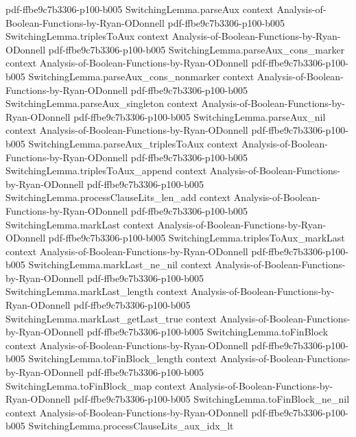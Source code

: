 \begin{lemma}
  {pdf-ffbe9c7b3306-p100-b005}
\proofstep
  {SwitchingLemma.parseAux}
  {context}
  {Analysis-of-Boolean-Functions-by-Ryan-ODonnell}
  {pdf-ffbe9c7b3306-p100-b005}
\proofstep
  {SwitchingLemma.triplesToAux}
  {context}
  {Analysis-of-Boolean-Functions-by-Ryan-ODonnell}
  {pdf-ffbe9c7b3306-p100-b005}
\proofstep
  {SwitchingLemma.parseAux_cons_marker}
  {context}
  {Analysis-of-Boolean-Functions-by-Ryan-ODonnell}
  {pdf-ffbe9c7b3306-p100-b005}
\proofstep
  {SwitchingLemma.parseAux_cons_nonmarker}
  {context}
  {Analysis-of-Boolean-Functions-by-Ryan-ODonnell}
  {pdf-ffbe9c7b3306-p100-b005}
\proofstep
  {SwitchingLemma.parseAux_singleton}
  {context}
  {Analysis-of-Boolean-Functions-by-Ryan-ODonnell}
  {pdf-ffbe9c7b3306-p100-b005}
\proofstep
  {SwitchingLemma.parseAux_nil}
  {context}
  {Analysis-of-Boolean-Functions-by-Ryan-ODonnell}
  {pdf-ffbe9c7b3306-p100-b005}
\proofstep
  {SwitchingLemma.parseAux_triplesToAux}
  {context}
  {Analysis-of-Boolean-Functions-by-Ryan-ODonnell}
  {pdf-ffbe9c7b3306-p100-b005}
\proofstep
  {SwitchingLemma.triplesToAux_append}
  {context}
  {Analysis-of-Boolean-Functions-by-Ryan-ODonnell}
  {pdf-ffbe9c7b3306-p100-b005}
\proofstep
  {SwitchingLemma.processClauseLits_len_add}
  {context}
  {Analysis-of-Boolean-Functions-by-Ryan-ODonnell}
  {pdf-ffbe9c7b3306-p100-b005}
\proofstep
  {SwitchingLemma.markLast}
  {context}
  {Analysis-of-Boolean-Functions-by-Ryan-ODonnell}
  {pdf-ffbe9c7b3306-p100-b005}
\proofstep
  {SwitchingLemma.triplesToAux_markLast}
  {context}
  {Analysis-of-Boolean-Functions-by-Ryan-ODonnell}
  {pdf-ffbe9c7b3306-p100-b005}
\proofstep
  {SwitchingLemma.markLast_ne_nil}
  {context}
  {Analysis-of-Boolean-Functions-by-Ryan-ODonnell}
  {pdf-ffbe9c7b3306-p100-b005}
\proofstep
  {SwitchingLemma.markLast_length}
  {context}
  {Analysis-of-Boolean-Functions-by-Ryan-ODonnell}
  {pdf-ffbe9c7b3306-p100-b005}
\proofstep
  {SwitchingLemma.markLast_getLast_true}
  {context}
  {Analysis-of-Boolean-Functions-by-Ryan-ODonnell}
  {pdf-ffbe9c7b3306-p100-b005}
\proofstep
  {SwitchingLemma.toFinBlock}
  {context}
  {Analysis-of-Boolean-Functions-by-Ryan-ODonnell}
  {pdf-ffbe9c7b3306-p100-b005}
\proofstep
  {SwitchingLemma.toFinBlock_length}
  {context}
  {Analysis-of-Boolean-Functions-by-Ryan-ODonnell}
  {pdf-ffbe9c7b3306-p100-b005}
\proofstep
  {SwitchingLemma.toFinBlock_map}
  {context}
  {Analysis-of-Boolean-Functions-by-Ryan-ODonnell}
  {pdf-ffbe9c7b3306-p100-b005}
\proofstep
  {SwitchingLemma.toFinBlock_ne_nil}
  {context}
  {Analysis-of-Boolean-Functions-by-Ryan-ODonnell}
  {pdf-ffbe9c7b3306-p100-b005}
\proofstep
  {SwitchingLemma.processClauseLits_aux_idx_lt}

\end{lemma}
